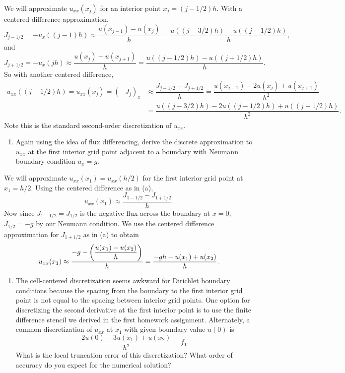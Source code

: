 \documentclass[12pt]{article}
\begin{document}
We will approximate $u_{xx}(x_j)$ for an interior point $x_j = (j-1/2)h$.
With a centered difference approximation,
$$J_{j-1/2} = -u_x((j-1)h) \approx \dfrac{u(x_{j-1})-u(x_j)}{h} = \dfrac{u((j-3/2)h) - u((j-1/2)h)}{h}, $$
and $$J_{j+1/2} = -u_x(jh) \approx \dfrac{u(x_{j})-u(x_{j+1})}{h} = \dfrac{u((j-1/2)h) - u((j+1/2)h)}{h}. $$
So with another centered difference, 
\begin{align*}
u_{xx}((j-1/2)h)= u_{xx}(x_j) = (-J_j)_x &\approx \dfrac{J_{j-1/2} - J_{j+1/2}}{h} = \dfrac{u(x_{j-1})-2u(x_j)+u(x_{j+1})}{h^2} \\
&= \dfrac{u((j-3/2)h) - 2u((j-1/2)h) + u((j+1/2)h)}{h^2}.
\end{align*}
Note this is the standard second-order discretization of $u_{xx}$.

\begin{enumerate}[ \ \ (b)]
\item Again using the idea of flux differencing, derive the discrete approximation to $u_{xx}$ at the first interior grid point adjacent to a boundary with Neumann boundary condition $u_x = g$.
\end{enumerate}

We will approximate $u_{xx}(x_1) = u_{xx}(h/2)$ for the first interior grid point at $x_1 = h/2$.
Using the centered difference as in (a), 
$$u_{xx}(x_1) \approx \dfrac{J_{1-1/2} - J_{1+1/2}}{h}.$$
Now since $J_{1-1/2}=J_{1/2}$ is the negative flux across the boundary at $x=0$, $J_{1/2} = - g$ by our Neumann condition.  We use the centered difference approximation for $J_{1+1/2}$ as in (a) to obtain
$$u_{xx}(x_1) \approx \dfrac{-g - \qty(\dfrac{u(x_1)-u(x_2)}{h})}{h} = \dfrac{-gh -u(x_1)+u(x_2)}{h}.$$
\begin{enumerate}[ \ \ (c)]
\item The cell-centered discretization seems awkward for Dirichlet boundary conditions because the spacing from the boundary to the first interior grid point is not equal to the spacing between interior grid points.  One option for discretizing the second derivative at the first interior point is to use the finite difference stencil we derived in the first homework assignment.  Alternately, a common discretization of $u_{xx}$ at $x_1$ with given boundary value $u(0)$ is
$$\dfrac{2u(0)-3u(x_1) + u(x_2)}{h^2} = f_1.$$
What is the local truncation error of this discretization?  What order of accuracy do you expect for the numerical solution?
\end{enumerate}
\end{document}
